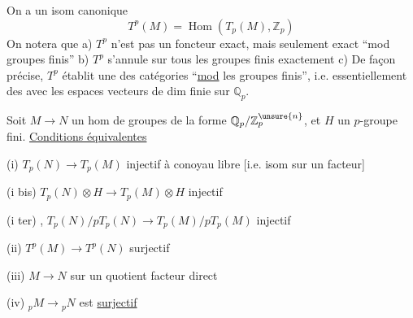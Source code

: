 On a un isom canonique
\[
T^p(M)=\operatorname{Hom}(T_p(M),\mathbb Z_p)
\]
On notera que a) $T^p$ n'est pas un foncteur exact, mais seulement exact ``mod groupes finis'' b) $T^p$ s'annule sur tous les groupes finis exactement c) De façon précise, $T^p$ établit une  des catégories ``\uline{mod} les groupes finis'', i.e. essentiellement des  avec les espaces vecteurs de dim finie sur $\mathbb Q_p$.

Soit $M\longrightarrow N$ un hom de groupes de la forme $\mathbb Q_p/\mathbb Z_p^{\unsure{n}}$, et $H$ un $p$-groupe fini. \uline{Conditions équivalentes}

(i) $T_p(N)\longrightarrow T_p(M)$ injectif à conoyau libre [i.e. isom sur un facteur]

(i bis) $T_p(N)\otimes H\longrightarrow T_p(M)\otimes H$ injectif

(i ter) , $T_p(N)/pT_p(N)\longrightarrow T_p(M)/pT_p(M)$ injectif

(ii) $T^p(M)\longrightarrow T^p(N)$ surjectif

(iii) $M\longrightarrow N$  sur un quotient facteur direct

(iv) ${}_pM\longrightarrow {}_pN$ est \uline{surjectif}
